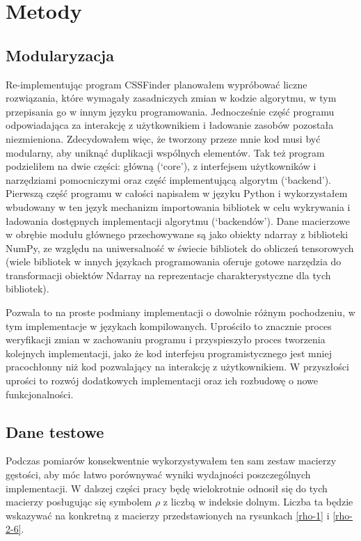 \documentclass[11pt, a4paper]{article}
\begin{document}
\begin{sloppypar}
    \section{Metody}
    \subsection{Modularyzacja}
    Re-implementując program CSSFinder planowałem wypróbować liczne rozwiązania, które wymagały
    zasadniczych zmian w kodzie algorytmu, w tym przepisania go w innym języku
    programowania. Jednocześnie część programu odpowiadająca za interakcję z użytkownikiem
    i ładowanie zasobów pozostała niezmieniona. Zdecydowałem więc, że tworzony przeze mnie
    kod musi być modularny, aby uniknąć duplikacji wspólnych elementów. Tak też program podzieliłem
    na dwie części: główną (`core'), z interfejsem użytkowników i narzędziami pomocniczymi
    oraz część implementującą algorytm (`backend'). Pierwszą część programu w całości
    napisałem w języku Python i wykorzystałem wbudowany w ten język mechanizm
    importowania bibliotek w celu wykrywania i ładowania dostępnych implementacji
    algorytmu (`backendów'). Dane macierzowe w obrębie modułu głównego przechowywane są jako
    obiekty ndarray z biblioteki NumPy, ze względu na uniwersalność w świecie bibliotek
    do obliczeń tensorowych (wiele bibliotek w innych językach programowania oferuje gotowe
    narzędzia do transformacji obiektów Ndarray na reprezentacje charakterystyczne dla tych
    bibliotek).

    Pozwala to na proste podmiany implementacji o dowolnie różnym pochodzeniu, w tym implementacje
    w językach kompilowanych. Uprościło to znacznie proces weryfikacji zmian w
    zachowaniu programu i przyspieszyło proces tworzenia kolejnych implementacji, jako że
    kod interfejsu programistycznego jest mniej pracochłonny niż kod pozwalający na interakcję
    z użytkownikiem. W przyszłości uprości to rozwój dodatkowych implementacji oraz ich
    rozbudowę o nowe funkcjonalności.

    \subsection{Dane testowe}
    Podczas pomiarów konsekwentnie wykorzystywałem ten sam zestaw macierzy gęstości, aby
    móc łatwo porównywać wyniki wydajności poszczególnych implementacji. W dalszej
    części pracy będę wielokrotnie odnosił się do tych macierzy posługując się symbolem
    $\rho$ z liczbą w indeksie dolnym. Liczba ta będzie wskazywać na konkretną z macierzy
    przedstawionych na rysunkach \ref{rho-1} i \ref{rho-2-6}.


\end{sloppypar}
\end{document}
